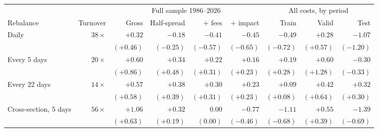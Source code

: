 \begin{tabular}{@{}l r r r r r r r r@{}}
\toprule
 & & \multicolumn{4}{c}{Full sample 1986--2026} & \multicolumn{3}{c}{All costs, by period} \\
\cmidrule(lr){3-6}\cmidrule(l){7-9}
Rebalance & Turnover & Gross & Half-spread & $+$ fees & $+$ impact & Train & Valid & Test \\
\midrule
Daily & $38\times$ & $+0.32$ & $-0.18$ & $-0.41$ & $-0.45$ & $-0.49$ & $+0.28$ & $-1.07$ \\
 &  & $(+0.46)$ & $(-0.25)$ & $(-0.57)$ & $(-0.65)$ & $(-0.72)$ & $(+0.57)$ & $(-1.20)$ \\
\addlinespace[2pt]
Every 5 days & $20\times$ & $+0.60$ & $+0.34$ & $+0.22$ & $+0.16$ & $+0.19$ & $+0.60$ & $-0.30$ \\
 &  & $(+0.86)$ & $(+0.48)$ & $(+0.31)$ & $(+0.23)$ & $(+0.28)$ & $(+1.28)$ & $(-0.33)$ \\
\addlinespace[2pt]
Every 22 days & $14\times$ & $+0.57$ & $+0.38$ & $+0.30$ & $+0.23$ & $+0.09$ & $+0.42$ & $+0.32$ \\
 &  & $(+0.58)$ & $(+0.39)$ & $(+0.31)$ & $(+0.23)$ & $(+0.08)$ & $(+0.64)$ & $(+0.30)$ \\
\addlinespace[2pt]
Cross-section, 5 days & $56\times$ & $+1.06$ & $+0.32$ & $0.00$ & $-0.77$ & $-1.11$ & $+0.55$ & $-1.39$ \\
 &  & $(+0.63)$ & $(+0.19)$ & $(0.00)$ & $(-0.46)$ & $(-0.68)$ & $(+0.39)$ & $(-0.69)$ \\
\bottomrule
\end{tabular}
